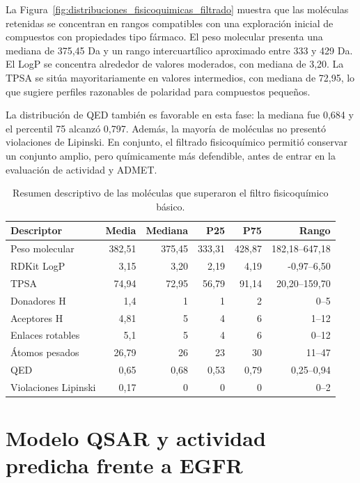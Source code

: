 \documentclass[IB]{TFUOC}%
\begin{document}
La Figura~\ref{fig:distribuciones_fisicoquimicas_filtrado} muestra que las moléculas retenidas se concentran en rangos compatibles con una exploración inicial de compuestos con propiedades tipo fármaco. El peso molecular presenta una mediana de 375,45 Da y un rango intercuartílico aproximado entre 333 y 429 Da. El LogP se concentra alrededor de valores moderados, con mediana de 3,20. La TPSA se sitúa mayoritariamente en valores intermedios, con mediana de 72,95, lo que sugiere perfiles razonables de polaridad para compuestos pequeños.

La distribución de QED también es favorable en esta fase: la mediana fue 0,684 y el percentil 75 alcanzó 0,797. Además, la mayoría de moléculas no presentó violaciones de Lipinski. En conjunto, el filtrado fisicoquímico permitió conservar un conjunto amplio, pero químicamente más defendible, antes de entrar en la evaluación de actividad y ADMET.

\begin{table}[H]
    \centering
    \small
    \begin{tabular}{p{4.2cm} r r r r r}
        \hline
        \textbf{Descriptor} & \textbf{Media} & \textbf{Mediana} & \textbf{P25} & \textbf{P75} & \textbf{Rango} \\
        \hline
        Peso molecular & 382,51 & 375,45 & 333,31 & 428,87 & 182,18--647,18 \\
        RDKit LogP & 3,15 & 3,20 & 2,19 & 4,19 & -0,97--6,50 \\
        TPSA & 74,94 & 72,95 & 56,79 & 91,14 & 20,20--159,70 \\
        Donadores H & 1,4 & 1 & 1 & 2 & 0--5 \\
        Aceptores H & 4,81 & 5 & 4 & 6 & 1--12 \\
        Enlaces rotables & 5,1 & 5 & 4 & 6 & 0--12 \\
        Átomos pesados & 26,79 & 26 & 23 & 30 & 11--47 \\
        QED & 0,65 & 0,68 & 0,53 & 0,79 & 0,25--0,94 \\
        Violaciones Lipinski & 0,17 & 0 & 0 & 0 & 0--2 \\
        \hline
    \end{tabular}
    \caption{Resumen descriptivo de las moléculas que superaron el filtro fisicoquímico básico.}
    \label{tab:resumen_descriptores_filtrados_resultados}
\end{table}

\section{Modelo QSAR y actividad predicha frente a EGFR}
\end{document}
